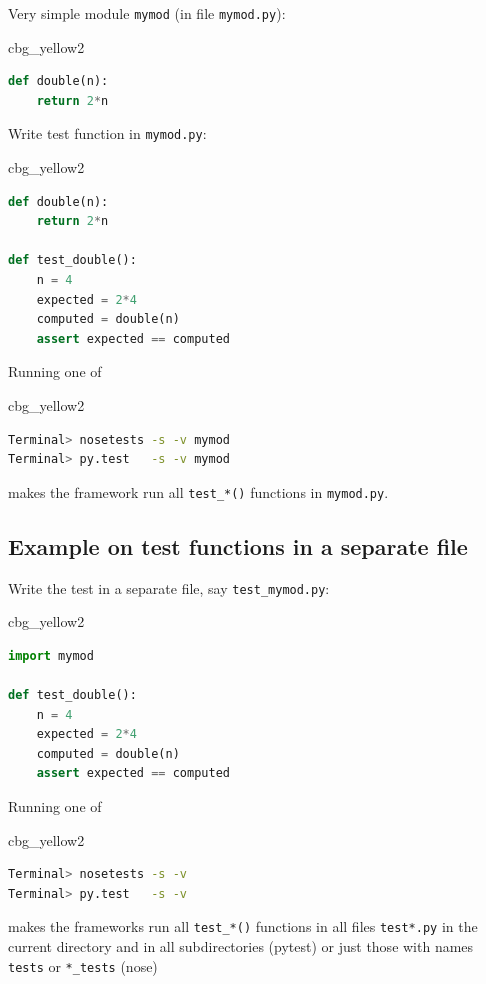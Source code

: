 \documentclass[%
oneside,                 %
final,                   %
10pt]{article}
\newenvironment{_cod_tight}[1]{
   \def\FrameCommand{\colorbox{#1}}
   \FrameRule0.6pt\MakeFramed {\FrameRestore}\vskip3mm}
   {\vskip0mm\endMakeFramed}
\newenvironment{cod}[1]{
\bgroup\rmfamily
\fboxsep=0mm\relax
\begin{_cod_tight}{#1}
\list{}{\parsep=-2mm\parskip=0mm\topsep=0pt\leftmargin=2mm
\rightmargin=2\leftmargin\leftmargin=4pt\relax}
\item\relax}
{\endlist\end{_cod_tight}\egroup}
\begin{document}
Very simple module \texttt{mymod} (in file \texttt{mymod.py}):

\begin{cod}{cbg_yellow2}\begin{lstlisting}[language=Python,style=simple,xleftmargin=2mm]
def double(n):
    return 2*n
\end{lstlisting}\end{cod}
\noindent

Write test function in \texttt{mymod.py}:

\begin{cod}{cbg_yellow2}\begin{lstlisting}[language=Python,style=simple,xleftmargin=2mm]
def double(n):
    return 2*n

def test_double():
    n = 4
    expected = 2*4
    computed = double(n)
    assert expected == computed
\end{lstlisting}\end{cod}
\noindent

Running one of

\begin{cod}{cbg_yellow2}\begin{lstlisting}[language=bash,style=simple,xleftmargin=2mm]
Terminal> nosetests -s -v mymod
Terminal> py.test   -s -v mymod
\end{lstlisting}\end{cod}
\noindent
makes the framework run all \Verb!test_*()! functions in \texttt{mymod.py}.

\subsection*{Example on test functions in a separate file}

Write the test in a separate file, say \Verb!test_mymod.py!:

\begin{cod}{cbg_yellow2}\begin{lstlisting}[language=Python,style=simple,xleftmargin=2mm]
import mymod

def test_double():
    n = 4
    expected = 2*4
    computed = double(n)
    assert expected == computed
\end{lstlisting}\end{cod}
\noindent

Running one of

\begin{cod}{cbg_yellow2}\begin{lstlisting}[language=bash,style=simple,xleftmargin=2mm]
Terminal> nosetests -s -v
Terminal> py.test   -s -v
\end{lstlisting}\end{cod}
\noindent
makes the frameworks run all \Verb!test_*()! functions in all files
\texttt{test*.py} in the current directory and in all subdirectories (pytest)
or just those with names \texttt{tests} or \Verb!*_tests! (nose)
\end{document}

